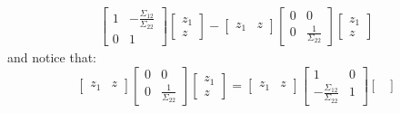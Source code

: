 \documentclass{article}
\begin{document}
\begin{itemize}
\begin{answer}
\begin{align*}
\begin{bmatrix}
                            1 & -\frac{\Sigma_{12}}{\Sigma_{22}} \\
                            0 & 1                                  
                        \end{bmatrix}\begin{bmatrix}
                            z_{1} \\
                            z       
                        \end{bmatrix} - \begin{bmatrix}
                            z_{1} & z   
                        \end{bmatrix}\begin{bmatrix}
                            0 & 0                     \\
                            0 & \frac{1}{\Sigma_{22}}   
                        \end{bmatrix}\begin{bmatrix}
                            z_{1} \\
                            z       
                        \end{bmatrix}
                    \end{align*}
                and notice that:
                    \begin{equation*}
                        \begin{bmatrix}
                            z_{1} & z   
                        \end{bmatrix}\begin{bmatrix}
                            0 & 0                     \\
                            0 & \frac{1}{\Sigma_{22}}   
                        \end{bmatrix}\begin{bmatrix}
                            z_{1} \\
                            z       
                        \end{bmatrix} = \begin{bmatrix}
                            z_{1} & z   
                        \end{bmatrix}\begin{bmatrix}
                            1                                & 0 \\
                            -\frac{\Sigma_{12}}{\Sigma_{22}} & 1   
                        \end{bmatrix}\begin{bmatrix}

\end{bmatrix}
\end{equation*}
\end{answer}
\end{itemize}
\end{document}
